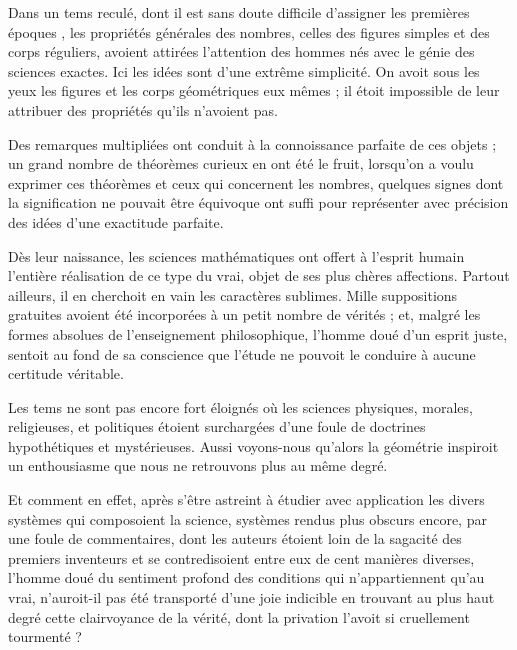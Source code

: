 \documentclass[11pt,a4paper]{article}
\begin{document}
Dans un tems reculé, dont il est sans doute difficile d'assigner les
premières époques , les propriétés
générales des nombres, celles des figures simples et des corps
réguliers, avoient attirées l'attention des hommes nés avec le génie des
sciences exactes. Ici les idées sont d'une extrême simplicité. On avoit
sous les yeux les figures et les corps géométriques eux mêmes ; il étoit
 impossible de leur attribuer des propriétés qu'ils
n'avoient pas.

Des remarques multipliées ont conduit à la connoissance parfaite de ces
objets ; un grand nombre de théorèmes curieux en ont été le fruit,
 lorsqu'on a voulu exprimer ces théorèmes et ceux qui
concernent les nombres, quelques signes dont la signification ne
pouvait être équivoque ont suffi pour représenter avec précision des
idées d'une exactitude parfaite.

Dès leur naissance, les sciences mathématiques ont offert à l'esprit
humain l'entière réalisation de ce type du vrai, objet de ses plus
chères affections. Partout ailleurs, il en cherchoit en vain les
caractères sublimes. Mille suppositions gratuites avoient été
incorporées à un petit nombre de vérités ; et, malgré les formes
absolues de l'enseignement philosophique, l'homme doué d'un esprit
juste, sentoit au fond de sa conscience que l'étude ne pouvoit le
conduire à aucune certitude véritable.

Les tems ne sont pas encore fort éloignés où les sciences physiques,
morales, religieuses, et politiques étoient 
surchargées  d'une foule de doctrines hypothétiques et
mystérieuses. Aussi voyons-nous qu'alors la géométrie inspiroit un
enthousiasme que nous ne retrouvons plus au même degré.

Et comment en effet, après s'être astreint à étudier avec application
les divers systèmes qui composoient la science, systèmes rendus plus
obscurs encore, par une foule de commentaires, dont les auteurs étoient
loin de la sagacité des premiers inventeurs et se contredisoient entre
eux de  cent manières diverses, l'homme doué du sentiment
profond des conditions qui n'appartiennent qu'au vrai, n'auroit-il pas
été transporté d'une joie indicible en trouvant au plus haut degré cette
 clairvoyance de la vérité, dont la privation
l'avoit si cruellement tourmenté ?
\end{document}
